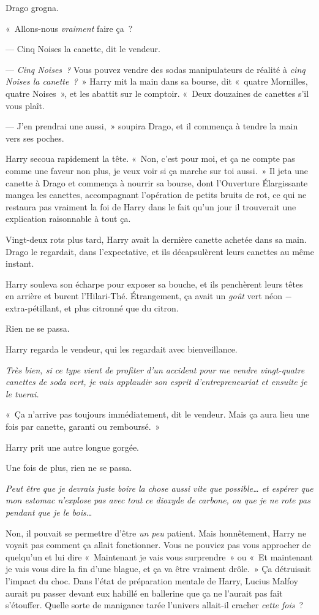 Drago grogna.

«~Allons-nous \emph{vraiment} faire ça~?

--- Cinq Noises la canette, dit le vendeur.

--- \emph{Cinq Noises~?} Vous pouvez vendre des sodas manipulateurs de réalité à \emph{cinq Noises la canette~?}~» Harry mit la main dans sa bourse, dit «~quatre Mornilles, quatre Noises~», et les abattit sur le comptoir. «~Deux douzaines de canettes s'il vous plaît.

--- J'en prendrai une aussi,~» soupira Drago, et il commença à tendre la main vers ses poches.

Harry secoua rapidement la tête. «~Non, c'est pour moi, et ça ne compte pas comme une faveur non plus, je veux voir si ça marche sur toi aussi.~» Il jeta une canette à Drago et commença à nourrir sa bourse, dont l'Ouverture Élargissante mangea les canettes, accompagnant l'opération de petits bruits de rot, ce qui ne restaura pas vraiment la foi de Harry dans le fait qu'un jour il trouverait une explication raisonnable à tout ça.

Vingt-deux rots plus tard, Harry avait la dernière canette achetée dans sa main. Drago le regardait, dans l'expectative, et ils décapsulèrent leurs canettes au même instant.

Harry souleva son écharpe pour exposer sa bouche, et ils penchèrent leurs têtes en arrière et burent l'Hilari-Thé. Étrangement, ça avait un \emph{goût} vert néon − extra-pétillant, et plus citronné que du citron.

Rien ne se passa.

Harry regarda le vendeur, qui les regardait avec bienveillance.

\emph{Très bien, si ce type vient de profiter d'un accident pour me vendre vingt-quatre canettes de soda vert, je vais applaudir son esprit d'entrepreneuriat et ensuite je le tuerai.}

«~Ça n'arrive pas toujours immédiatement, dit le vendeur. Mais ça aura lieu une fois par canette, garanti ou remboursé.~»

Harry prit une autre longue gorgée.

Une fois de plus, rien ne se passa.

\emph{Peut être que je devrais juste boire la chose aussi vite que possible… et espérer que mon estomac n'explose pas avec tout ce dioxyde de carbone, ou que je ne rote pas pendant que je le bois…}

Non, il pouvait se permettre d'être \emph{un peu} patient. Mais honnêtement, Harry ne voyait pas comment ça allait fonctionner. Vous ne pouviez pas vous approcher de quelqu'un et lui dire «~Maintenant je vais vous surprendre~» ou «~Et maintenant je vais vous dire la fin d'une blague, et ça va être vraiment drôle.~» Ça détruisait l'impact du choc. Dans l'état de préparation mentale de Harry, Lucius Malfoy aurait pu passer devant eux habillé en ballerine que ça ne l'aurait pas fait s'étouffer. Quelle sorte de manigance tarée l'univers allait-il cracher \emph{cette fois}~?

